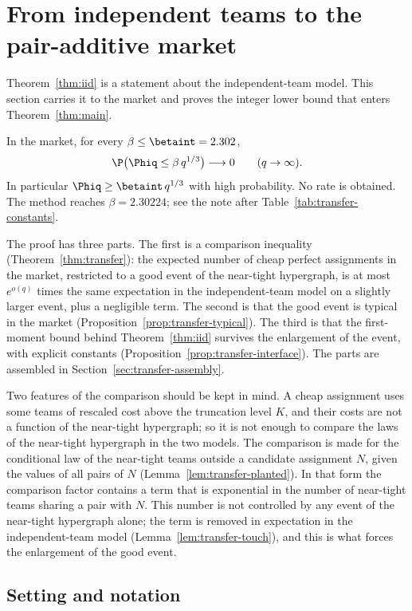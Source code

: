 \section{From independent teams to the pair-additive market}\label{sec:transfer}

Theorem~\ref{thm:iid} is a statement about the independent-team model. This section carries it
to the market and proves the integer lower bound that enters Theorem~\ref{thm:main}.

\begin{theorem}\label{thm:integer}
In the market, for every $\beta\le\betaint=2.302$,
\[
\P\bigl(\Phiq\le\beta\,q^{1/3}\bigr)\longrightarrow0\qquad(q\to\infty).
\]
In particular $\Phiq\ge\betaint\,q^{1/3}$ with high probability. No rate is obtained.
The method reaches $\beta=2.30224$; see the note after Table~\ref{tab:transfer-constants}.
\end{theorem}

The proof has three parts. The first is a comparison inequality
(Theorem~\ref{thm:transfer}): the expected number of cheap perfect assignments in the market,
restricted to a good event of the near-tight hypergraph, is at most $e^{o(q)}$ times the same
expectation in the independent-team model on a slightly larger event, plus a negligible term.
The second is that the good event is typical in the market
(Proposition~\ref{prop:transfer-typical}). The third is that the first-moment bound behind
Theorem~\ref{thm:iid} survives the enlargement of the event, with explicit constants
(Proposition~\ref{prop:transfer-interface}). The parts are assembled in
Section~\ref{sec:transfer-assembly}.

Two features of the comparison should be kept in mind. A cheap assignment uses some teams of
rescaled cost above the truncation level $K$, and their costs are not a function of the
near-tight hypergraph; so it is not enough to compare the laws of the near-tight hypergraph in
the two models. The comparison is made for the conditional law of the near-tight teams outside
a candidate assignment $N$, given the values of all pairs of $N$
(Lemma~\ref{lem:transfer-planted}). In that form the comparison factor contains a term that is
exponential in the number of near-tight teams sharing a pair with $N$. This number is not
controlled by any event of the near-tight hypergraph alone; the term is removed in expectation
in the independent-team model (Lemma~\ref{lem:transfer-touch}), and this is what forces the
enlargement of the good event.

\subsection{Setting and notation}\label{sec:transfer-setting}

